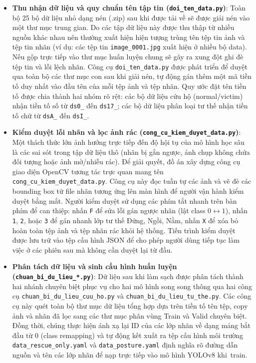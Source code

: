 \begin{itemize}
    \item \textbf{Thu nhận dữ liệu và quy chuẩn tên tập tin (\texttt{doi\_ten\_data.py})}: 
    Toàn bộ 25 bộ dữ liệu nhỏ dạng nén (.zip) sau khi được tải về sẽ được giải nén vào một thư mục trung gian. Do các tập dữ liệu này được thu thập từ nhiều nguồn khác nhau nên thường xuất hiện hiện tượng trùng tên tệp tin ảnh và tệp tin nhãn (ví dụ: các tệp tin \texttt{image\_0001.jpg} xuất hiện ở nhiều bộ data). Nếu gộp trực tiếp vào thư mục huấn luyện chung sẽ gây ra xung đột ghi đè tệp tin và lỗi lệch nhãn. Công cụ \texttt{doi\_ten\_data.py} được phát triển để duyệt qua toàn bộ các thư mục con sau khi giải nén, tự động gán thêm một mã tiền tố duy nhất vào đầu tên của mỗi tệp ảnh và tệp nhãn. Quy ước đặt tên tiền tố được chia thành hai nhóm rõ rệt: các bộ dữ liệu cứu hộ (normal/victim) nhận tiền tố số từ \texttt{ds0\_} đến \texttt{ds17\_}; các bộ dữ liệu phân loại tư thế nhận tiền tố chữ từ \texttt{dsA\_} đến \texttt{dsI\_}.
    
    \item \textbf{Kiểm duyệt lỗi nhãn và lọc ảnh rác (\texttt{cong\_cu\_kiem\_duyet\_data.py})}:
    Một thách thức lớn ảnh hưởng trực tiếp đến độ hội tụ của mô hình học sâu là các sai sót trong tập dữ liệu thô (nhãn bị gắn ngược, ảnh chụp không chứa đối tượng hoặc ảnh mờ/nhiễu rác). Để giải quyết, đồ án xây dựng công cụ giao diện OpenCV tương tác trực quan mang tên \texttt{cong\_cu\_kiem\_duyet\_data.py}. Công cụ này đọc tuần tự các ảnh và vẽ đè các bounding box từ file nhãn tương ứng lên màn hình để người vận hành kiểm duyệt bằng mắt. Người kiểm duyệt sử dụng các phím tắt nhanh trên bàn phím để can thiệp: nhấn \texttt{F} để sửa lỗi gán ngược nhãn (lật class $0 \leftrightarrow 1$), nhấn \texttt{1}, \texttt{2}, hoặc \texttt{3} để gán nhanh lớp tư thế Đứng, Ngồi, Nằm, nhấn \texttt{X} để xóa bỏ hoàn toàn tệp ảnh và tệp nhãn rác khỏi hệ thống. Tiến trình kiểm duyệt được lưu trữ vào tệp cấu hình JSON để cho phép người dùng tiếp tục làm việc ở các phiên sau mà không cần duyệt lại từ đầu.
    
    \item \textbf{Phân tách dữ liệu và sinh cấu hình huấn luyện (\texttt{chuan\_bi\_du\_lieu\_*.py})}:
    Dữ liệu sau khi làm sạch được phân tách thành hai nhánh chuyên biệt phục vụ cho hai mô hình song song thông qua hai công cụ \texttt{chuan\_bi\_du\_lieu\_cuu\_ho.py} và \texttt{chuan\_bi\_du\_lieu\_tu\_the.py}. Các công cụ này quét toàn bộ thư mục dữ liệu tổng hợp dựa trên tiền tố tên tệp, copy ảnh và nhãn đã lọc sang các thư mục phân vùng Train và Valid chuyên biệt. Đồng thời, chúng thực hiện ánh xạ lại ID của các lớp nhãn về dạng mảng bắt đầu từ $0$ (class remapping) và tự động kết xuất ra tệp cấu hình môi trường \texttt{data\_rescue\_only.yaml} và \texttt{data\_posture.yaml} định nghĩa rõ đường dẫn nguồn và tên các lớp nhãn để nạp trực tiếp vào mô hình YOLOv8 khi~train.
\end{itemize}

